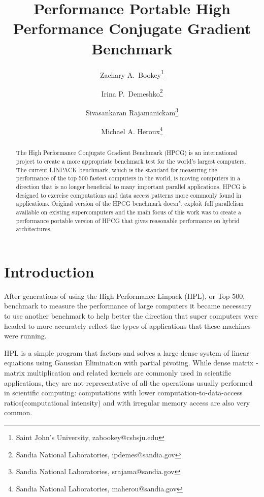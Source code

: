 \documentclass{ccr15}
\title{Performance Portable High Performance Conjugate Gradient Benchmark}
\author{Zachary A.\ Bookey\thanks{Saint John's University, zabookey@csbsju.edu} \and Irina P.\ Demeshko\thanks{Sandia National Laboratories,
ipdemes@sandia.gov} \and Sivasankaran Rajamanickam\thanks{Sandia National Laboratories, srajama@sandia.gov}\and Michael A. Heroux\thanks{Sandia National Laboratories, maherou@sandia.gov}}
\begin{document}
\maketitle
\begin{abstract}
The High Performance Conjugate Gradient Benchmark (HPCG) is an international project to create a
more appropriate benchmark test for the world's largest computers. The current LINPACK benchmark,
which is the standard for measuring the performance of the top 500 fastest computers in the
world, is moving computers in a direction that is no longer beneficial to many important
parallel applications. HPCG is designed to exercise computations and data access patterns more commonly found in applications.
Original version  of  the HPCG benchmark doesn't exploit full parallelism available on existing supercomputers and the main focus of this work 
was to create a performance portable version of HPCG that gives reasonable performance on hybrid architectures.

\end{abstract}

\section{Introduction}

After generations of using the High Performance Linpack (HPL), or Top 500, benchmark \cite{ZAB:Top500} to measure the
performance of large computers it became necessary to use another benchmark to help better the
direction that super computers were headed to more accurately reflect the types of applications
that these machines were running.

HPL is a simple program that factors and solves a large dense system of linear equations using
Gaussian Elimination with partial pivoting.
While dense matrix - matrix multiplication and related kernels are commonly used in scientific applications,
they are not representative of all the operations usually performed in scientific computing:
computations with lower computation-to-data-access ratios(computational intensity) and with
irregular memory access are also very common.
\end{document}
